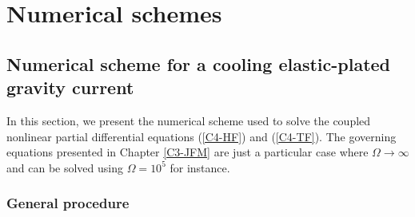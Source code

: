 \chapter{Numerical  schemes}
\label{chap:A1}

\section{  Numerical  scheme  for  a  cooling  elastic-plated  gravity
  current}
\label{A1-sec:-cool-elast-plat}

In this  section, we present  the numerical  scheme used to  solve the
coupled  nonlinear partial  differential  equations (\ref{C4-HF})  and
(\ref{C4-TF}).    The  governing   equations   presented  in   Chapter
\ref{C3-JFM}     are     just      a     particular     case     where
$\Omega \rightarrow \infty$ and can  be solved using $\Omega=10^5$ for
instance.

\subsection{General procedure}
\label{C3-sec:general-procedure}

